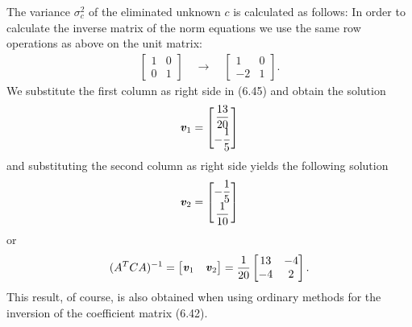 The variance $ \sigma^{2}_{c}$ of the eliminated unknown $c$ is calculated as follows: In order to calculate the inverse matrix of the norm equations we use the same row operations as above on the unit matrix:
\begin{align*}
\begin{bmatrix}
1 & 0\\
0 & 1
\end{bmatrix}
\quad
\rightarrow
\quad
\begin{bmatrix}
1 & 0\\
-2 & 1
\end{bmatrix}.
\end{align*}
We substitute the first column as right side in (6.45) and obtain the solution
\begin{align*}
\textbf{\textit{v}}_{1} = 
\begin{bmatrix}
\dfrac{13}{20}\\
-\dfrac{1}{5}
\end{bmatrix}
\end{align*}
and substituting the second column as right side yields the following solution
\begin{align*}
\textbf{\textit{v}}_{2} = 
\begin{bmatrix}
-\dfrac{1}{5}\\
\dfrac{1}{10}
\end{bmatrix}
\end{align*}
or
\begin{align*}
(A^{T}CA)^{-1} = 
\begin{bmatrix}
\textbf{\textit{v}}_{1} & \textbf{\textit{v}}_{2}
 \end{bmatrix} =
 \dfrac{1}{20}
 \begin{bmatrix}
13 & -4\\
-4 & 2 
 \end{bmatrix}.
\end{align*}
This result, of course, is also obtained when using ordinary methods for the inversion of the coefficient matrix (6.42).

